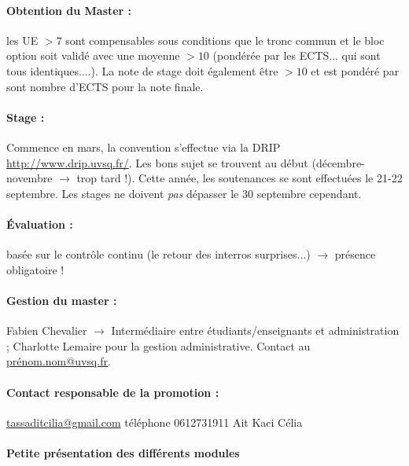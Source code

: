 \documentclass{article}
\begin{document}
\paragraph{Obtention du Master :} les UE $>7$ sont compensables sous conditions que le tronc commun et le bloc option soit validé avec une moyenne $>10$ (pondérée par les ECTS... qui sont tous identiques....). La note de stage doit également être $>10$ et est pondéré par sont nombre d'ECTS pour la note finale.


\paragraph{Stage :} Commence en mars, la convention s'effectue via la DRIP \url{http://www.drip.uvsq.fr/}. Les bons sujet se trouvent au début (décembre-novembre $\to$ trop tard !). Cette année, les soutenances se sont effectuées le 21-22 septembre. Les stages ne doivent \emph{pas} dépasser le 30 septembre cependant.

\paragraph{Évaluation :} basée sur le contrôle continu (le retour des interros surprises...) $\to$ présence obligatoire !

\paragraph{Gestion du master :} Fabien Chevalier $\to$ Intermédiaire entre étudiants/enseignants et administration ; Charlotte Lemaire pour la gestion administrative. Contact au \url{prénom.nom@uvsq.fr}.

\paragraph{Contact responsable de la promotion :}\url{tassaditcilia@gmail.com} téléphone 0612731911 Ait Kaci Célia

\paragraph{Petite présentation des différents modules}
\end{document}
